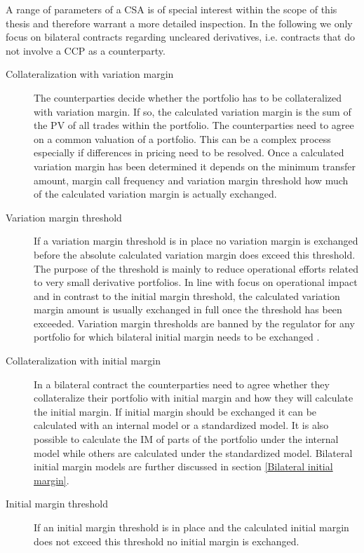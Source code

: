\documentclass[../Thesis_AHoecherl.tex]{subfiles}
\begin{document}
A range of parameters of a CSA is of special interest within the scope of this thesis and therefore warrant a more detailed inspection. 
In the following we only focus on bilateral contracts regarding uncleared derivatives, i.e. contracts that do not involve a \gls{CCP} as a counterparty.

\begin{description}
    \item[Collateralization with variation margin]
    The counterparties decide whether the portfolio has to be collateralized with variation margin.
    If so, the calculated variation margin is the sum of the \gls{PV} of all trades within the portfolio.
    The counterparties need to agree on a common valuation of a portfolio. This can be a complex process especially if differences in pricing need to be resolved.
    Once a calculated variation margin has been determined it depends on the minimum transfer amount, margin call frequency and variation margin threshold how much of the calculated variation margin is actually exchanged. 
    \item[Variation margin threshold]
    If a variation margin threshold is in place no variation margin is exchanged before the absolute calculated variation margin does exceed this threshold.
    The purpose of the threshold is mainly to reduce operational efforts related to very small derivative portfolios. In line with focus on operational impact and in contrast to the initial margin threshold, the calculated variation margin amount is usually exchanged in full once the threshold has been exceeded.
    Variation margin thresholds are banned by the regulator for any portfolio for which bilateral initial margin needs to be exchanged \cite[Requirement 2.1]{BCBS_MarginRequirements}. 
    \item[Collateralization with initial margin]
    In a bilateral contract the counterparties need to agree whether they collateralize their portfolio with initial margin and how they will calculate the initial margin.
    If initial margin should be exchanged it can be calculated with an internal model or a standardized model. It is also possible to calculate the IM of parts of the portfolio under the internal model while others are calculated under the standardized model.
    Bilateral initial margin models are further discussed in section \ref{Bilateral initial margin}.
    \item[Initial margin threshold]
    If an initial margin threshold is in place and the calculated initial margin does not exceed this threshold no initial margin is exchanged.

\end{description}
\end{document}
